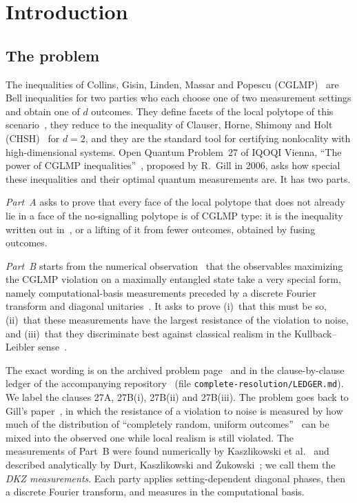 \documentclass[11pt]{article}
\theoremstyle{remark}
\numberwithin{equation}{section}
\begin{document}
\section{Introduction}\label{sec:intro}

\subsection{The problem}
The inequalities of Collins, Gisin, Linden, Massar and Popescu (CGLMP)~\cite{CGLMP} are Bell inequalities for two
parties who each choose one of two measurement settings and obtain one of $d$ outcomes. They define facets of the local
polytope of this scenario~\cite{Masanes}, they reduce to the inequality of Clauser, Horne, Shimony and Holt
(CHSH)~\cite{CHSH} for $d=2$, and they are the standard tool for certifying nonlocality with high-dimensional systems.
Open Quantum Problem~27 of IQOQI Vienna, ``The power of CGLMP inequalities''~\cite{OQP}, proposed by R.~Gill in 2006,
asks how special these inequalities and their optimal quantum measurements are. It has two parts.

\emph{Part~A} asks to prove that every face of the local polytope that does not already lie in a face of the
no-signalling polytope is of CGLMP type: it is the inequality written out in~\cite{CGLMP}, or a lifting of it from
fewer outcomes, obtained by fusing outcomes.

\emph{Part~B} starts from the numerical observation~\cite{DKZ} that the observables maximizing the CGLMP violation on
a maximally entangled state take a very special form, namely computational-basis measurements preceded by a discrete
Fourier transform and diagonal unitaries~\cite{CGLMP}. It asks to prove (i)~that this must be so, (ii)~that these
measurements have the largest resistance of the violation to noise, and (iii)~that they discriminate best against
classical realism in the Kullback--Leibler sense~\cite{vDGG}.

The exact wording is on the archived problem page~\cite{OQP} and in the clause-by-clause ledger of the accompanying
repository~\cite{repo} (file \texttt{complete-resolution/LEDGER.md}). We label the clauses 27A, 27B(i), 27B(ii) and
27B(iii). The problem goes back to Gill's paper~\cite{Gill}, in which the resistance of a violation to noise is measured
by how much of the distribution of ``completely random, uniform outcomes''~\cite[p.~140]{Gill} can be mixed into the
observed one while local realism is still violated. The measurements of Part~B were found numerically by Kaszlikowski
et al.~\cite{KGZMZ} and described analytically by Durt, Kaszlikowski and \.Zukowski~\cite{DKZ}; we call them the
\emph{DKZ measurements}. Each party applies setting-dependent diagonal phases, then a discrete Fourier transform, and
measures in the computational basis.
\end{document}
